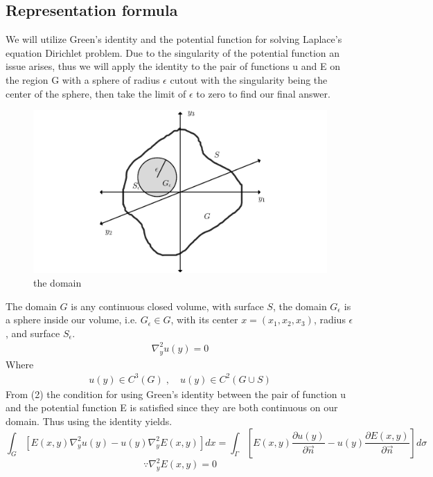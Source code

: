 \documentclass[]{article}
\begin{document}
\subsection{Representation formula}
We will utilize Green's identity and the potential function for solving Laplace's equation Dirichlet problem. Due to the singularity of the potential function an issue arises, thus we will apply the identity to the pair of functions u and E on the region G with a sphere of radius $\epsilon$ cutout with the singularity being the center of the sphere, then take the limit of $\epsilon$ to zero to find our final answer.
\begin{figure}[h]
\begin{center}
\includegraphics[scale=0.15]{rep.png}
\captionlabelfalse
\caption{the domain}
\end{center}
\end{figure}
The domain $G$ is any continuous closed volume, with surface $S$, the domain $G_\epsilon$ is a sphere inside our volume, i.e. $G_\epsilon \in G$, with its center $x = (x_1,x_2,x_3)$, radius $\epsilon$, and surface $S_\epsilon$. 
\begin{align}
\nabla_{y}^{2} u(y) =0
\end{align}
Where
\begin{align}
u(y) \in C^3(G)\;,\quad u(y) \in C^2(G\cup S)
\end{align}
From (2) the condition for using Green's identity between the pair of function u and the potential function E is satisfied since they are both continuous on our domain. Thus using the identity yields.
\[
    \int_G \left[E(x,y)\nabla_{y}^{2} u(y) - u(y)\nabla_{y}^{2} E(x,y)\right]dx = \int_\Gamma \left[E(x,y)\frac{\partial u(y)}{\partial \vec{n}}-u(y)\frac{\partial E(x,y)}{\partial \vec{n}}\right] d\sigma    
\]
\[
  \because \nabla_{y}^{2} E(x,y) = 0    
\]
\end{document}
